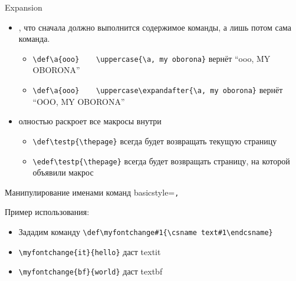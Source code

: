 \begin{frame}[fragile]{Expansion\magicPage}\relax
    \footnotesize
    \begin{itemize}
        \item \ccol\expandafter{}, что сначала должно выполнится содержимое команды, а лишь потом сама команда.
        \begin{itemize}
            \item \lstinline|\def\a{ooo}    \uppercase{\a, my oborona}| вернёт ``ooo, MY OBORONA''
            \item \lstinline|\def\a{ooo}    \uppercase\expandafter{\a, my oborona}| вернёт ``OOO, MY OBORONA''
        \end{itemize}
        \item \ccol\edef\ полностью раскроет все макросы внутри
        \begin{itemize}
            \item \lstinline|\def\testp{\thepage}| всегда будет возвращать текущую страницу
            \item \lstinline|\edef\testp{\thepage}| всегда будет возвращать страницу, на которой объявили макрос
        \end{itemize}
        
    \end{itemize}
     
\end{frame}
{\def\myfontchange#1{\csname text#1\endcsname}
\begin{frame}[fragile]{Манипулирование именами команд\magicPage}\relax
     \lstset
    {
        basicstyle=\tt\normalsize,
    }
    \pause
    
    Пример использования:
    \begin{itemize}
    \item Зададим команду \lstinline|\def\myfontchange#1{\csname text#1\endcsname}|
    \item \lstinline|\myfontchange{it}{hello}| даст \myfontchange{it}{hello}
    \item \lstinline|\myfontchange{bf}{world}| даст \myfontchange{bf}{world}
    \end{itemize}
\end{frame}

}
